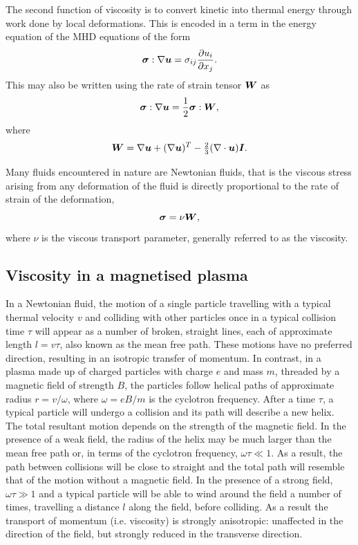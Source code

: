 The second function of viscosity is to convert kinetic into thermal energy through work done by local deformations. This is encoded in a term in the energy equation of the MHD equations of the form
\begin{equation}
  \label{eq:viscous_heat_generation}
  {\bm \sigma} : \nabla {\bm u} = \sigma_{ij} \frac{\partial u_i}{\partial x_j}.
\end{equation}
This may also be written using the rate of strain tensor ${\bm W}$ as
\begin{equation}
  \label{eq:viscous_heat_generation2}
  {\bm \sigma} : \nabla {\bm u} = \frac{1}{2} {\bm \sigma} : {\bm W},
\end{equation}
where
\begin{equation}
  \label{eq:rate_of_strain}
  {\bm W} = \nabla{\bm u} + (\nabla{\bm u})^T - \tfrac{2}{3}(\nabla \cdot {\bm u}){\bm I}.
\end{equation}

Many fluids encountered in nature are Newtonian fluids, that is the viscous stress arising from any deformation of the fluid is directly proportional to the rate of strain of the deformation,
\begin{equation}
  \label{eq:isotropic_viscous_tensor}
  {\bm \sigma} = \nu {\bm W},
\end{equation}
where $\nu$ is the viscous transport parameter, generally referred to as the viscosity.

\subsection{Viscosity in a magnetised plasma}

In a Newtonian fluid, the motion of a single particle travelling with a typical thermal velocity $v$ and colliding with other particles once in a typical collision time $\tau$ will appear as a number of broken, straight lines, each of approximate length $l = v\tau$, also known as the mean free path. These motions have no preferred direction, resulting in an isotropic transfer of momentum. In contrast, in a plasma made up of charged particles with charge $e$ and mass $m$, threaded by a magnetic field of strength $B$, the particles follow helical paths of approximate radius $r = v/\omega$, where $\omega = eB/m$ is the cyclotron frequency. After a time $\tau$, a typical particle will undergo a collision and its path will describe a new helix. The total resultant motion depends on the strength of the magnetic field. In the presence of a weak field, the radius of the helix may be much larger than the mean free path or, in terms of the cyclotron frequency, $\omega \tau \ll 1$. As a result, the path between collisions will be close to straight and the total path will resemble that of the motion without a magnetic field. In the presence of a strong field, $\omega \tau \gg 1$ and a typical particle will be able to wind around the field a number of times, travelling a distance $l$ along the field, before colliding. As a result the transport of momentum (i.e. viscosity) is strongly anisotropic: unaffected in the direction of the field, but strongly reduced in the transverse direction.

